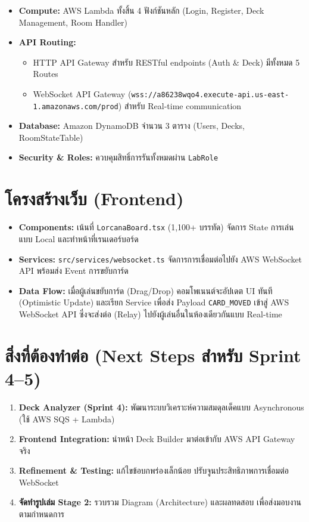 \documentclass[12pt,a4paper]{article}
\begin{document}
\begin{itemize}[leftmargin=1.5em, itemsep=3pt]
  \item \textbf{Compute:} AWS Lambda ทั้งสิ้น 4 ฟังก์ชันหลัก (Login, Register, Deck Management, Room Handler)
  \item \textbf{API Routing:}
  \begin{itemize}[leftmargin=1.5em, itemsep=2pt]
    \item HTTP API Gateway สำหรับ RESTful endpoints (Auth \& Deck) มีทั้งหมด 5 Routes
    \item WebSocket API Gateway (\texttt{wss://a86238wqo4.execute-api.us-east-1.amazonaws.com/prod}) สำหรับ Real-time communication
  \end{itemize}
  \item \textbf{Database:} Amazon DynamoDB จำนวน 3 ตาราง (Users, Decks, RoomStateTable)
  \item \textbf{Security \& Roles:} ควบคุมสิทธิ์การรันทั้งหมดผ่าน \texttt{LabRole}
\end{itemize}

\section{โครงสร้างเว็บ (Frontend)}

\begin{itemize}[leftmargin=1.5em, itemsep=3pt]
  \item \textbf{Components:} เน้นที่ \texttt{LorcanaBoard.tsx} (1,100+ บรรทัด) จัดการ State การเล่นแบบ Local และทำหน้าที่เรนเดอร์บอร์ด
  \item \textbf{Services:} \texttt{src/services/websocket.ts} จัดการการเชื่อมต่อไปยัง AWS WebSocket API พร้อมส่ง Event การขยับการ์ด
  \item \textbf{Data Flow:} เมื่อผู้เล่นขยับการ์ด (Drag/Drop) คอมโพเนนต์จะอัปเดต UI ทันที (Optimistic Update) และเรียก Service เพื่อส่ง Payload \texttt{CARD\_MOVED} เข้าสู่ AWS WebSocket API ซึ่งจะส่งต่อ (Relay) ไปยังผู้เล่นอื่นในห้องเดียวกันแบบ Real-time
\end{itemize}

\section{สิ่งที่ต้องทำต่อ (Next Steps สำหรับ Sprint 4--5)}

\begin{enumerate}[leftmargin=1.5em, itemsep=3pt]
  \item \textbf{Deck Analyzer (Sprint 4):} พัฒนาระบบวิเคราะห์ความสมดุลเด็คแบบ Asynchronous (ใช้ AWS SQS + Lambda)
  \item \textbf{Frontend Integration:} นำหน้า Deck Builder มาต่อเข้ากับ AWS API Gateway จริง
  \item \textbf{Refinement \& Testing:} แก้ไขข้อบกพร่องเล็กน้อย ปรับจูนประสิทธิภาพการเชื่อมต่อ WebSocket
  \item \textbf{จัดทำรูปเล่ม Stage 2:} รวบรวม Diagram (Architecture) และผลทดสอบ เพื่อส่งมอบงานตามกำหนดการ
\end{enumerate}
\end{document}
